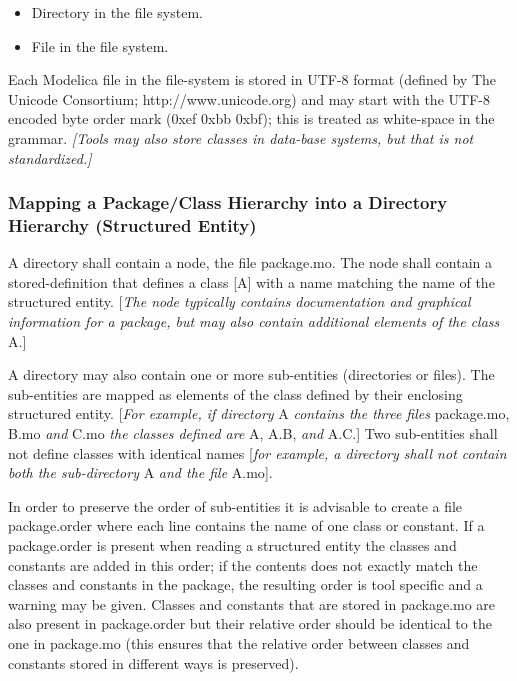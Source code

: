 \documentclass[10pt,a4paper]{report}
\def\doublelabel#1{\label{#1}}
\begin{document}
\begin{itemize}
\item
  Directory in the file system.
\end{itemize}

\begin{itemize}
\item
  File in the file system.
\end{itemize}

Each Modelica file in the file-system is stored in UTF-8 format (defined
by The Unicode Consortium; http://www.unicode.org) and may start with
the UTF-8 encoded byte order mark (0xef 0xbb 0xbf); this is treated as
white-space in the grammar. \emph{{[}Tools may also store classes in
data-base systems, but that is not standardized.{]}}

\subsubsection{Mapping a Package/Class Hierarchy into a Directory Hierarchy (Structured Entity)}\doublelabel{mapping-a-package-class-hierarchy-into-a-directory-hierarchy-structured-entity}

A directory shall contain a node, the file package.mo. The node shall contain a stored-definition that defines a class {[}A{]} with a name
matching the name of the structured entity. {[}\emph{The node typically
contains documentation and graphical information for a package, but may
also contain additional elements of the class} A.{]}

A directory may also contain one or more sub-entities (directories or
files). The sub-entities are mapped as elements of the class defined by
their enclosing structured entity. {[}\emph{For example, if directory} A
\emph{contains the three files} package.mo, B.mo \emph{and} C.mo
\emph{the classes defined are} A, A.B, \emph{and} A.C.{]} Two
sub-entities shall not define classes with identical names {[}\emph{for
example, a directory shall not contain both the sub-directory} A
\emph{and the file} A.mo{]}.

In order to preserve the order of sub-entities it is advisable to create
a file package.order where each line contains the name of one class or
constant. If a package.order is present when reading a structured entity
the classes and constants are added in this order; if the contents does
not exactly match the classes and constants in the package, the
resulting order is tool specific and a warning may be given. Classes and
constants that are stored in package.mo are also present in
package.order but their relative order should be identical to the one in
package.mo (this ensures that the relative order between classes and
constants stored in different ways is preserved).
\end{document}
